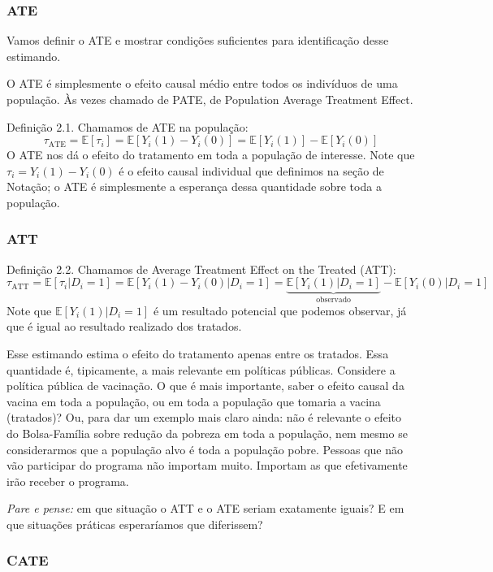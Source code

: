\documentclass[
]{article}
\begin{document}
\subsubsection{ATE}\label{ate}

Vamos definir o ATE e mostrar condições suficientes para identificação desse estimando.

O ATE é simplesmente o efeito causal médio entre todos os indivíduos de uma população. Às vezes chamado de PATE, de Population Average Treatment Effect.

Definição 2.1. Chamamos de ATE na população:
\[\tau_{\text{ATE}} = \mathbb{E}[\tau_i] = \mathbb{E}[Y_i(1) - Y_i(0)] = \mathbb{E}[Y_i(1)] - \mathbb{E}[Y_i(0)]\]
O ATE nos dá o efeito do tratamento em toda a população de interesse. Note que \(\tau_i = Y_i(1) - Y_i(0)\) é o efeito causal individual que definimos na seção de Notação; o ATE é simplesmente a esperança dessa quantidade sobre toda a população.

\subsubsection{ATT}\label{att}

Definição 2.2. Chamamos de Average Treatment Effect on the Treated (ATT):
\[\tau_{\text{ATT}} = \mathbb{E}[\tau_i|D_i=1] = \mathbb{E}[Y_i(1) - Y_i(0)|D_i=1] = \underbrace{\mathbb{E}[Y_i(1)|D_i=1]}_{\text{observado}} - \mathbb{E}[Y_i(0)|D_i=1]\]
Note que \(\mathbb{E}[Y_i(1)|D_i=1]\) é um resultado potencial que podemos observar, já que é igual ao resultado realizado dos tratados.

Esse estimando estima o efeito do tratamento apenas entre os tratados. Essa quantidade é, tipicamente, a mais relevante em políticas públicas. Considere a política pública de vacinação. O que é mais importante, saber o efeito causal da vacina em toda a população, ou em toda a população que tomaria a vacina (tratados)? Ou, para dar um exemplo mais claro ainda: não é relevante o efeito do Bolsa-Família sobre redução da pobreza em toda a população, nem mesmo se considerarmos que a população alvo é toda a população pobre. Pessoas que não vão participar do programa não importam muito. Importam as que efetivamente irão receber o programa.

\emph{Pare e pense:} em que situação o ATT e o ATE seriam exatamente iguais? E em que situações práticas esperaríamos que diferissem?

\subsubsection{CATE}\label{cate}
\end{document}
